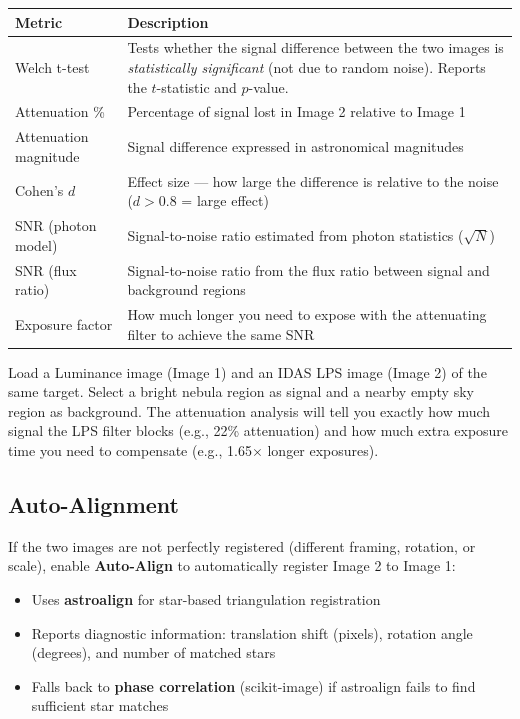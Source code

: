 \documentclass[11pt,a4paper]{article}
\begin{document}
\begin{center}
\begin{tabular}{lp{8cm}}
\toprule
\textbf{Metric} & \textbf{Description} \\
\midrule
Welch t-test & Tests whether the signal difference between the two images is \emph{statistically significant} (not due to random noise). Reports the $t$-statistic and $p$-value. \\
Attenuation \% & Percentage of signal lost in Image 2 relative to Image 1 \\
Attenuation magnitude & Signal difference expressed in astronomical magnitudes \\
Cohen's $d$ & Effect size --- how large the difference is relative to the noise ($d > 0.8$ = large effect) \\
SNR (photon model) & Signal-to-noise ratio estimated from photon statistics ($\sqrt{N}$) \\
SNR (flux ratio) & Signal-to-noise ratio from the flux ratio between signal and background regions \\
Exposure factor & How much longer you need to expose with the attenuating filter to achieve the same SNR \\
\bottomrule
\end{tabular}
\end{center}

\begin{tipbox}
Load a Luminance image (Image 1) and an IDAS LPS image (Image 2) of the same target. Select a bright nebula region as signal and a nearby empty sky region as background. The attenuation analysis will tell you exactly how much signal the LPS filter blocks (e.g., 22\% attenuation) and how much extra exposure time you need to compensate (e.g., 1.65$\times$ longer exposures).
\end{tipbox}

\subsection{Auto-Alignment}

If the two images are not perfectly registered (different framing, rotation, or scale), enable \textbf{Auto-Align} to automatically register Image 2 to Image 1:

\begin{itemize}
    \item Uses \textbf{astroalign} for star-based triangulation registration
    \item Reports diagnostic information: translation shift (pixels), rotation angle (degrees), and number of matched stars
    \item Falls back to \textbf{phase correlation} (scikit-image) if astroalign fails to find sufficient star matches
\end{itemize}
\end{document}

